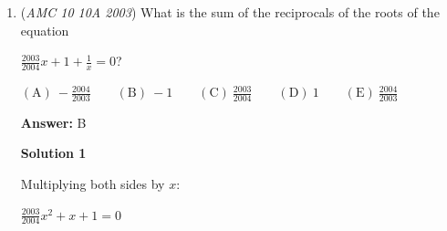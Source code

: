 \begin{enumerate}
\textbf{Solution 1}

Let $s$ be the length of a side of the equilateral triangle and let $r$ be the radius of the circle. 

 In a circle with a radius $r$, the side of an inscribed equilateral triangle is $r\sqrt{3}$. 

 So $s=r\sqrt{3}$. 

 The perimeter of the triangle is $3s=3r\sqrt{3}$

 The area of the circle is $\pi r^{2}$

 So: $\pi r^{2} = 3r\sqrt{3}$
$\pi r=3\sqrt{3}$
$r=\frac{3\sqrt{3}}{\pi} \Rightarrow\boxed{\mathrm{(B)}\ \frac{3\sqrt{3}}{\pi}}$




\textbf{Solution 2}

As in Solution $1$, let $s$ be the side length of the equilateral triangle and let $r$ be the radius of the circumcircle. Remembering that the formula for radius of a circumcircle is $\frac{abc}{4A}$, where $a$, $b$, and $c$ are side lengths of the triangle, and $A$ is its area, we define each of the quantities in the formula. Since $a = b = c = s$ and, by the formula for the area of an equilateral triangle, $A = \frac{s^2\sqrt{3}}{4}$, the circumradius is $\frac{s^3}{4\frac{s^2\sqrt{3}}{4}} = \frac{s}{\sqrt{3}}$. The area of the circumcircle is then $\pi(\frac{s}{\sqrt{3}})^2 = \frac{\pi s^2}{3}$. Because this is equal to the perimeter of the triangle, we equate this to $3s$. Upon solving, we note that the nonzero value of $s$ is then $\frac{9}{\pi}$. We can now plug this back into the circumradius formula we found earlier to get that $r = \frac{\frac{9}{\pi}}{\sqrt{3}} = \boxed{\textbf{(B)} \frac{3 \sqrt{3}}{\pi}}$.

 


	\item (\textit{AMC 10 10A 2003}) What is the sum of the reciprocals of the roots of the equation 


 $\frac{2003}{2004}x+1+\frac{1}{x}=0$?


 $\mathrm{(A) \ } -\frac{2004}{2003}\qquad \mathrm{(B) \ } -1\qquad \mathrm{(C) \ } \frac{2003}{2004}\qquad \mathrm{(D) \ } 1\qquad \mathrm{(E) \ } \frac{2004}{2003}$

 \textbf{Answer: }B



\textbf{Solution 1}

Multiplying both sides by $x$: 

 $\frac{2003}{2004}x^{2}+x+1=0$


\end{enumerate}
